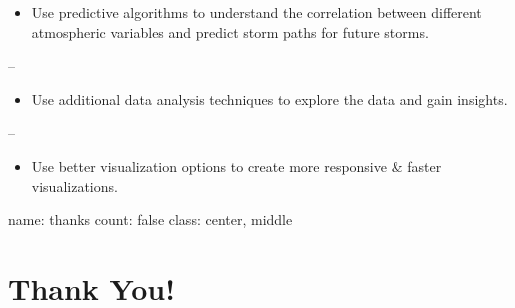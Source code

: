 \documentclass[]{article}
\providecommand{\tightlist}{%
  \setlength{\itemsep}{0pt}\setlength{\parskip}{0pt}}
\begin{document}
\begin{itemize}
\tightlist
\item
  Use predictive algorithms to understand the correlation between
  different atmospheric variables and predict storm paths for future
  storms.
\end{itemize}

--

\begin{itemize}
\tightlist
\item
  Use additional data analysis techniques to explore the data and gain
  insights.
\end{itemize}

--

\begin{itemize}
\tightlist
\item
  Use better visualization options to create more responsive \& faster
  visualizations.
\end{itemize}

name: thanks count: false class: center, middle

\section{Thank You!}\label{thank-you}
\end{document}
